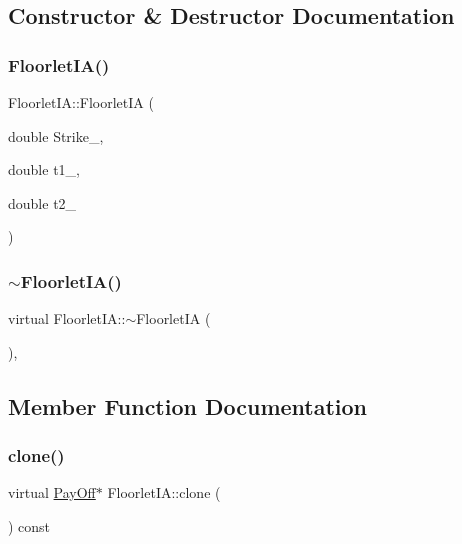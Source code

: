 \subsection{Constructor \& Destructor Documentation}
\hypertarget{classFloorletIA_a490751e65075139da8dd97cef885ea5e}{}\label{classFloorletIA_a490751e65075139da8dd97cef885ea5e} 
\subsubsection{\texorpdfstring{Floorlet\+I\+A()}{FloorletIA()}}
{\footnotesize\ttfamily Floorlet\+I\+A\+::\+Floorlet\+IA (\begin{DoxyParamCaption}\item[{double}]{Strike\+\_\+,  }\item[{double}]{t1\+\_\+,  }\item[{double}]{t2\+\_\+ }\end{DoxyParamCaption})}

\hypertarget{classFloorletIA_af6072805d770100c0db4a7b7c4f0b104}{}\label{classFloorletIA_af6072805d770100c0db4a7b7c4f0b104} 
\subsubsection{\texorpdfstring{$\sim$\+Floorlet\+I\+A()}{~FloorletIA()}}
{\footnotesize\ttfamily virtual Floorlet\+I\+A\+::$\sim$\+Floorlet\+IA (\begin{DoxyParamCaption}{ }\end{DoxyParamCaption})\hspace{0.3cm}{\ttfamily [inline]}, {\ttfamily [virtual]}}



\subsection{Member Function Documentation}
\hypertarget{classFloorletIA_a8eb08ed3039bb2ef7f5881bcbc8cb85b}{}\label{classFloorletIA_a8eb08ed3039bb2ef7f5881bcbc8cb85b} 
\subsubsection{\texorpdfstring{clone()}{clone()}}
{\footnotesize\ttfamily virtual \hyperlink{classPayOff}{Pay\+Off}$\ast$ Floorlet\+I\+A\+::clone (\begin{DoxyParamCaption}{ }\end{DoxyParamCaption}) const\hspace{0.3cm}{\ttfamily [virtual]}}



